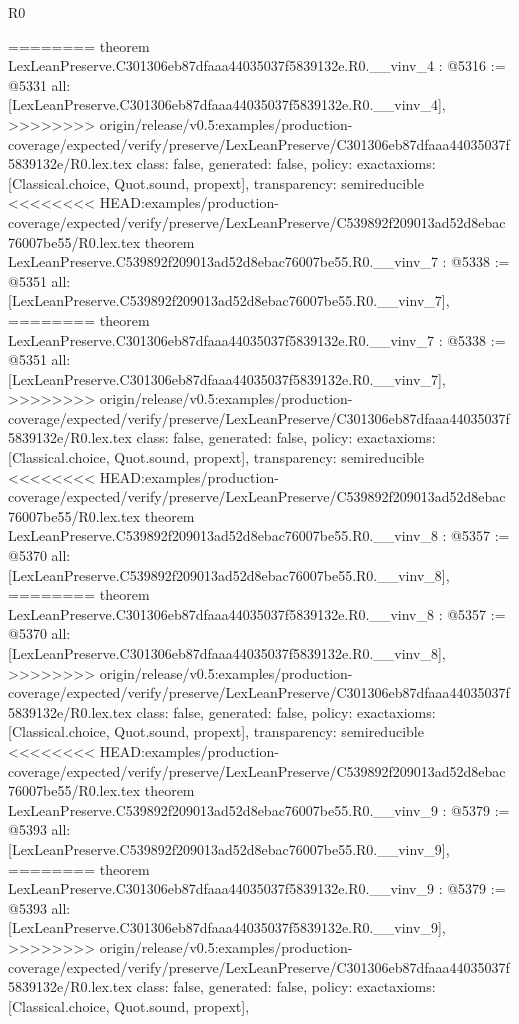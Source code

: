 \begin{lexlean}{R0}
\begin{coremodule}
{{{{{{{{{{{{{{{{{{{{{{{{{{{{{{{{{{{{{{{{{{{{{{{{{{{{{{{{{{{{{{{{{{{{{{{{{{========
theorem LexLeanPreserve.C301306eb87dfaaa44035037f5839132e.R0.__vinv_4 : @5316 := @5331 {
  all: [LexLeanPreserve.C301306eb87dfaaa44035037f5839132e.R0.__vinv_4],
>>>>>>>> origin/release/v0.5:examples/production-coverage/expected/verify/preserve/LexLeanPreserve/C301306eb87dfaaa44035037f5839132e/R0.lex.tex
  class: false,
  generated: false,
  policy: exact{axioms: [Classical.choice, Quot.sound, propext]},
  transparency: semireducible
}
<<<<<<<< HEAD:examples/production-coverage/expected/verify/preserve/LexLeanPreserve/C539892f209013ad52d8ebac76007be55/R0.lex.tex
theorem LexLeanPreserve.C539892f209013ad52d8ebac76007be55.R0.__vinv_7 : @5338 := @5351 {
  all: [LexLeanPreserve.C539892f209013ad52d8ebac76007be55.R0.__vinv_7],
========
theorem LexLeanPreserve.C301306eb87dfaaa44035037f5839132e.R0.__vinv_7 : @5338 := @5351 {
  all: [LexLeanPreserve.C301306eb87dfaaa44035037f5839132e.R0.__vinv_7],
>>>>>>>> origin/release/v0.5:examples/production-coverage/expected/verify/preserve/LexLeanPreserve/C301306eb87dfaaa44035037f5839132e/R0.lex.tex
  class: false,
  generated: false,
  policy: exact{axioms: [Classical.choice, Quot.sound, propext]},
  transparency: semireducible
}
<<<<<<<< HEAD:examples/production-coverage/expected/verify/preserve/LexLeanPreserve/C539892f209013ad52d8ebac76007be55/R0.lex.tex
theorem LexLeanPreserve.C539892f209013ad52d8ebac76007be55.R0.__vinv_8 : @5357 := @5370 {
  all: [LexLeanPreserve.C539892f209013ad52d8ebac76007be55.R0.__vinv_8],
========
theorem LexLeanPreserve.C301306eb87dfaaa44035037f5839132e.R0.__vinv_8 : @5357 := @5370 {
  all: [LexLeanPreserve.C301306eb87dfaaa44035037f5839132e.R0.__vinv_8],
>>>>>>>> origin/release/v0.5:examples/production-coverage/expected/verify/preserve/LexLeanPreserve/C301306eb87dfaaa44035037f5839132e/R0.lex.tex
  class: false,
  generated: false,
  policy: exact{axioms: [Classical.choice, Quot.sound, propext]},
  transparency: semireducible
}
<<<<<<<< HEAD:examples/production-coverage/expected/verify/preserve/LexLeanPreserve/C539892f209013ad52d8ebac76007be55/R0.lex.tex
theorem LexLeanPreserve.C539892f209013ad52d8ebac76007be55.R0.__vinv_9 : @5379 := @5393 {
  all: [LexLeanPreserve.C539892f209013ad52d8ebac76007be55.R0.__vinv_9],
========
theorem LexLeanPreserve.C301306eb87dfaaa44035037f5839132e.R0.__vinv_9 : @5379 := @5393 {
  all: [LexLeanPreserve.C301306eb87dfaaa44035037f5839132e.R0.__vinv_9],
>>>>>>>> origin/release/v0.5:examples/production-coverage/expected/verify/preserve/LexLeanPreserve/C301306eb87dfaaa44035037f5839132e/R0.lex.tex
  class: false,
  generated: false,
  policy: exact{axioms: [Classical.choice, Quot.sound, propext]},
}}}}}}}}}}}}}}}}}}}}}}}}}}}}}}}}}}}}}}}}}}}}}}}}}}}}}}}}}}}}}}}}}}}}}}}}}}}}}}
\end{coremodule}
\end{lexlean}
